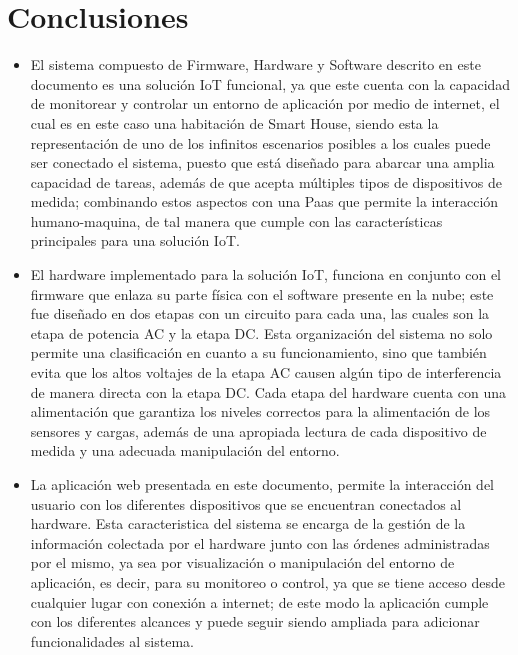 \chapter{Conclusiones}

\begin{itemize}
	\item El sistema compuesto de Firmware, Hardware y Software descrito en este documento es una solución IoT funcional, ya que este cuenta con la capacidad de monitorear y controlar un entorno de aplicación por medio de internet, el cual es en este caso una habitación de Smart House, siendo esta la representación de uno de los infinitos escenarios posibles a los cuales puede ser conectado el sistema, puesto que está diseñado para abarcar una amplia capacidad de tareas, además de que acepta múltiples tipos de dispositivos de medida; combinando estos aspectos con una Paas que permite la interacción humano-maquina, de tal manera que cumple con las características principales para una solución IoT.\\
	
	\item El hardware implementado para la solución IoT, funciona en conjunto con el firmware que enlaza su parte física con el software presente en la nube; este fue diseñado en dos etapas con un circuito para cada una, las cuales son la etapa de potencia AC y la etapa DC. Esta organización del sistema no solo permite una clasificación en cuanto a su funcionamiento, sino que también evita que los altos voltajes de la etapa AC causen algún tipo de interferencia de manera directa con la etapa DC. Cada etapa del hardware cuenta con una alimentación que garantiza los niveles correctos para la alimentación de los sensores y cargas, además de una apropiada lectura de cada dispositivo de medida y una adecuada manipulación del entorno.\\
	
	\item La aplicación web presentada en este documento, permite la interacción del usuario con los diferentes dispositivos que se encuentran conectados al hardware. Esta caracteristica del sistema se encarga de la gestión de la información colectada por el hardware junto con las órdenes administradas por el mismo, ya sea por visualización o manipulación del entorno de aplicación, es decir, para su monitoreo o control, ya que se tiene acceso desde cualquier lugar con conexión a internet; de este modo la aplicación cumple con los diferentes alcances y puede seguir siendo ampliada para adicionar funcionalidades al sistema.\\
	

\end{itemize}
